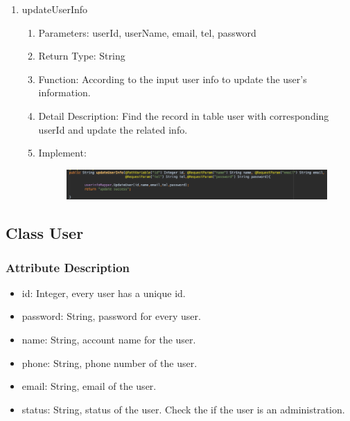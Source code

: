 \documentclass[16pt]{scrreprt}
\begin{document}
\begin{enumerate}
\begin{enumerate}
\begin{figure}[H]
\end{figure}
\end{enumerate}
    \item updateUserInfo
    \begin{enumerate}
        \item Parameters: userId, userName, email, tel, password
        \item Return Type: String
        \item Function: According to the input user info to update the user's information.
        \item Detail Description: Find the record in table user with corresponding userId and update the related info.
        \item Implement:
        \begin{figure}[H]
    \centering
    \includegraphics[width=1.\textwidth]{diagrams/updateinfofunc.png}\\
\end{figure}
    \end{enumerate}
\end{enumerate}

\subsection{Class User}
\subsubsection{Attribute Description}
\begin{itemize}
    \item id: Integer, every user has a unique id.
    \item password: String, password for every user.
    \item name: String, account name for the user.
    \item phone: String, phone number of the user.
    \item email: String, email of the user.
    \item status: String, status of the user. Check the if the user is an administration.
\end{itemize}
\end{document}
